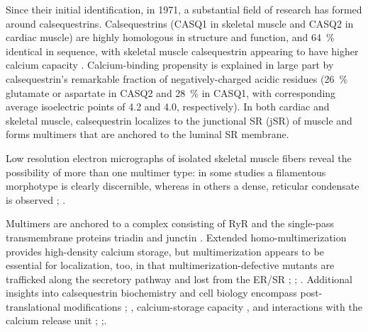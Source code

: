 Since their initial identification, in 1971, a substantial field of research has formed around calsequestrins. Calsequestrins (CASQ1 in skeletal muscle and CASQ2 in cardiac muscle) are highly homologous in structure and function, and \SI{64}{\percent} identical in sequence, with skeletal muscle calsequestrin appearing to have higher calcium capacity \cite{Park2004-bu}. Calcium-binding propensity is explained in large part by calsequestrin's remarkable fraction of negatively-charged acidic residues (\SI{26}{\percent} glutamate or aspartate in CASQ2 and \SI{28}{\percent} in CASQ1, with corresponding average isoelectric points of 4.2 and 4.0, respectively). In both cardiac and skeletal muscle, calsequestrin localizes to the junctional SR (jSR) of muscle and forms multimers that are anchored to the luminal SR membrane. 
\begin{hlbreakable} 
Low resolution electron micrographs of isolated skeletal muscle fibers reveal the possibility of more than one multimer type: in some studies a filamentous morphotype is clearly discernible, whereas in others a dense, reticular condensate is observed \cite{Franzini-Armstrong1987-xb}; \cite{Perni2013-ew}.
\end{hlbreakable}
Multimers are anchored to a complex consisting of RyR and the single-pass transmembrane proteins triadin and junctin \cite{Bers2004-ns}. Extended homo-multimerization provides high-density calcium storage, but multimerization appears to be essential for localization, too, in that multimerization-defective mutants are trafficked along the secretory pathway and lost from the ER/SR \cite{Milstein2009-ig}; \cite{McFarland2010-yi}; \cite{Knollmann2010-fl}. Additional insights into calsequestrin biochemistry and cell biology encompass post-translational modifications \cite{Sanchez2012-yl}; \cite{Kirchhefer2010-ui}, calcium-storage capacity \cite{Park2004-bu}, and interactions with the calcium release unit \cite{Zhang1997-dy}; \cite{Rani2016-ql};\cite{Handhle2016-mz}.

